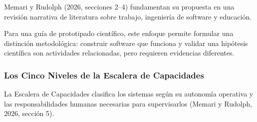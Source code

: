 Memari y Rudolph (2026, secciones 2--4) fundamentan su propuesta en una revisión narrativa de literatura sobre trabajo, ingeniería de software y educación. %

Para una guía de prototipado científico, este enfoque permite formular una distinción metodológica: construir software que funciona y validar una hipótesis científica son actividades relacionadas, pero requieren evidencias diferentes. %

\subsubsection{Los Cinco Niveles de la Escalera de Capacidades} %

La Escalera de Capacidades clasifica los sistemas según su autonomía operativa y las responsabilidades humanas necesarias para supervisarlos (Memari y Rudolph, 2026, sección 5). %

